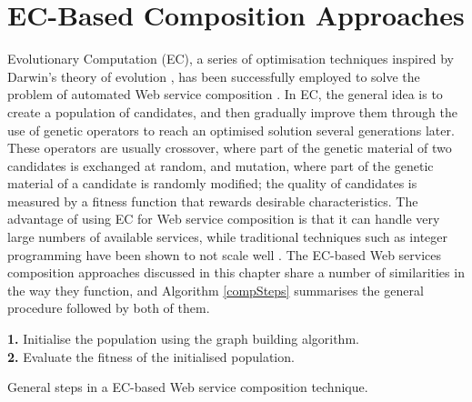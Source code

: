 \section{EC-Based Composition Approaches}

Evolutionary Computation (EC), a series of optimisation techniques inspired by Darwin's theory of evolution \cite{back2000evolutionary}, has been successfully employed to solve the problem of automated Web service composition \cite{pejman2012web}. In EC, the general idea is to create a population of candidates, and then gradually improve them through the use of genetic operators to reach an optimised solution several generations later. These operators are usually crossover, where part of the genetic material of two candidates is exchanged at random, and mutation, where part of the genetic material of a candidate is randomly modified; the quality of candidates is measured by a fitness function that rewards desirable characteristics. The advantage of using EC for Web service composition is that it can handle very large numbers of available services, while traditional techniques such as integer programming have been shown to not scale well \cite{canfora2005approach}. The EC-based Web services composition approaches discussed in this chapter share a number of similarities in the way they function, and Algorithm \ref{compSteps} summarises the general procedure followed by both of them.

\begin{algorithm}
 \setlength{}
 \let\oldnl\nl%
\newcommand{\nonl}{\renewcommand{\nl}{\let\nl\oldnl}}
 \LinesNumbered
	\textbf{1.} Initialise the population using the graph building algorithm.\\
	\textbf{2.} Evaluate the fitness of the initialised population.\\
	\nonl {}
 \caption{\footnotesize General steps in a EC-based Web service composition technique.}
 \label{compSteps}
\end{algorithm}

